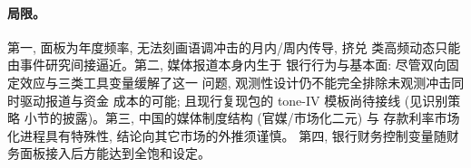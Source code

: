\paragraph{局限。}
第一, 面板为年度频率, 无法刻画语调冲击的月内/周内传导, 挤兑
类高频动态只能由事件研究间接逼近。第二, 媒体报道本身内生于
银行行为与基本面: 尽管双向固定效应与三类工具变量缓解了这一
问题, 观测性设计仍不能完全排除未观测冲击同时驱动报道与资金
成本的可能; 且现行复现包的 tone-IV 模板尚待接线 (见识别策略
小节的披露)。第三, 中国的媒体制度结构 (官媒/市场化二元) 与
存款利率市场化进程具有特殊性, 结论向其它市场的外推须谨慎。
第四, 银行财务控制变量随财务面板接入后方能达到全饱和设定。

\printbibliography



